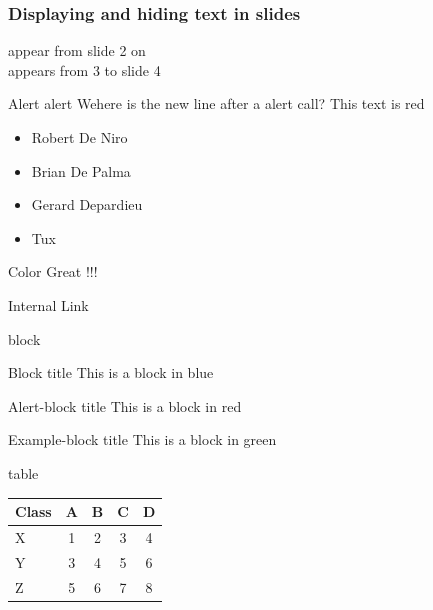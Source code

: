 \documentclass{Beamer}
\begin{document}
\begin{frame}
  \frametitle{Displaying and hiding text in slides}
  {appear from slide 2 on\\}
  {appears from 3 to slide 4\\}
\end{frame}

\begin{frame}{Alert}
  \alert{alert}
  Wehere is the new line after a alert call?
  \alert<1>{This text} \alert<2>{is} \alert<3>{red}
  \begin{itemize}
  \item <+-| alert@+> Robert De Niro
  \item <+-| alert@+> Brian De Palma
  \item <+-| alert@+> Gerard Depardieu
  \item <+-| alert@+> Tux
  \end{itemize}
\end{frame}

\begin{frame}{Color}
Great !!!
\end{frame}

\begin{frame}{Internal Link}
  \hyperlink{titlepage}{}
\end{frame}

\begin{frame}{block}

  \begin{block}{Block title}
    This is a block in blue
  \end{block}

  \begin{alertblock}{Alert-block title}
    This is a block in red
  \end{alertblock}

  \begin{exampleblock}{Example-block title}
    This is a block in green
  \end{exampleblock}
\end{frame}

\begin{frame}{table}
\begin{tabular}{lcccc}
  Class & A & B & C & D \\\hline
  X     & 1 & 2 & 3 & 4 \pause\\
  Y     & 3 & 4 & 5 & 6 \pause\\
  Z     &5&6&7&8
\end{tabular}
\end{frame}
\end{document}

